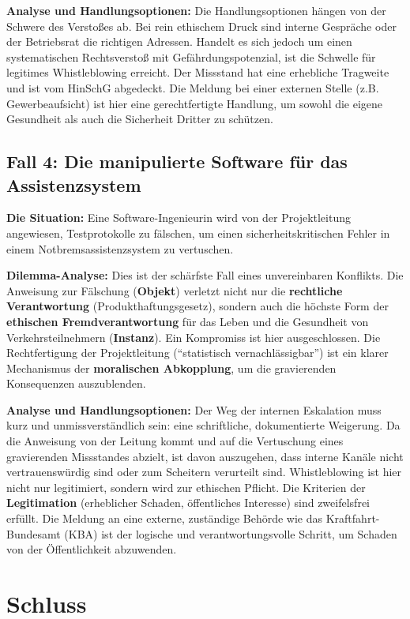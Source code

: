 \documentclass[
    12pt,               %
    a4paper,            %
    ngerman             %
]{scrartcl}
\begin{document}
\textbf{Analyse und Handlungsoptionen:}
Die Handlungsoptionen hängen von der Schwere des Verstoßes ab. Bei rein ethischem Druck sind interne Gespräche oder der Betriebsrat die richtigen Adressen. Handelt es sich jedoch um einen systematischen Rechtsverstoß mit Gefährdungspotenzial, ist die Schwelle für legitimes Whistleblowing erreicht. Der Missstand hat eine erhebliche Tragweite und ist vom HinSchG abgedeckt. Die Meldung bei einer externen Stelle (z.B. Gewerbeaufsicht) ist hier eine gerechtfertigte Handlung, um sowohl die eigene Gesundheit als auch die Sicherheit Dritter zu schützen.

\subsection{Fall 4: Die manipulierte Software für das Assistenzsystem}

\textbf{Die Situation:} Eine Software-Ingenieurin wird von der Projektleitung angewiesen, Testprotokolle zu fälschen, um einen sicherheitskritischen Fehler in einem Notbremsassistenzsystem zu vertuschen.

\textbf{Dilemma-Analyse:}
Dies ist der schärfste Fall eines unvereinbaren Konflikts. Die Anweisung zur Fälschung (\textbf{Objekt}) verletzt nicht nur die \textbf{rechtliche Verantwortung} (Produkthaftungsgesetz), sondern auch die höchste Form der \textbf{ethischen Fremdverantwortung} für das Leben und die Gesundheit von Verkehrsteilnehmern (\textbf{Instanz}). Ein Kompromiss ist hier ausgeschlossen. Die Rechtfertigung der Projektleitung (\enquote{statistisch vernachlässigbar}) ist ein klarer Mechanismus der \textbf{moralischen Abkopplung}, um die gravierenden Konsequenzen auszublenden.

\textbf{Analyse und Handlungsoptionen:}
Der Weg der internen Eskalation muss kurz und unmissverständlich sein: eine schriftliche, dokumentierte Weigerung. Da die Anweisung von der Leitung kommt und auf die Vertuschung eines gravierenden Missstandes abzielt, ist davon auszugehen, dass interne Kanäle nicht vertrauenswürdig sind oder zum Scheitern verurteilt sind. Whistleblowing ist hier nicht nur legitimiert, sondern wird zur ethischen Pflicht. Die Kriterien der \textbf{Legitimation} (erheblicher Schaden, öffentliches Interesse) sind zweifelsfrei erfüllt. Die Meldung an eine externe, zuständige Behörde wie das Kraftfahrt-Bundesamt (KBA) ist der logische und verantwortungsvolle Schritt, um Schaden von der Öffentlichkeit abzuwenden.

\section{Schluss}
\end{document}
